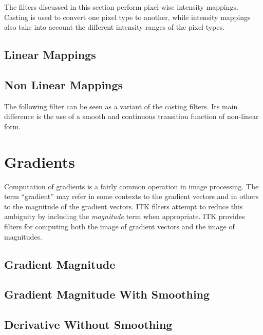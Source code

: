 The filters discussed in this section perform pixel-wise intensity mappings.
Casting is used to convert one pixel type to another, while intensity mappings
also take into account the different intensity ranges of the pixel types.

\subsection{Linear Mappings}
\label{sec:IntensityLinearMapping}




\subsection{Non Linear Mappings}
\label{sec:IntensityNonLinearMapping}

The following filter can be seen as a variant of the casting filters. Its main
difference is the use of a smooth and continuous transition function of
non-linear form.




\section{Gradients}
\label{sec:GradientFiltering}

Computation of gradients is a fairly common operation in image processing. The
term ``gradient'' may refer in some contexts to the gradient vectors and in
others to the magnitude of the gradient vectors. ITK filters attempt to
reduce this ambiguity by including the \emph{magnitude} term when
appropriate. ITK provides filters for computing both the image of gradient
vectors and the image of magnitudes.

\subsection{Gradient Magnitude}
\label{sec:GradientMagnitudeImageFilter}



\subsection{Gradient Magnitude With Smoothing}
\label{sec:GradientMagnitudeRecursiveGaussianImageFilter}



\subsection{Derivative Without Smoothing}
\label{sec:DerivativeImageFilter}



